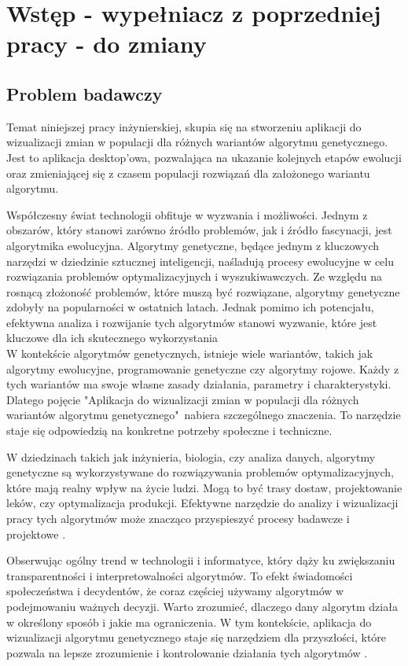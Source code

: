 \chapter[Wstęp]{Wstęp - wypełniacz z poprzedniej pracy - do zmiany}
\section{Problem badawczy}
Temat niniejszej pracy inżynierskiej, skupia się na stworzeniu aplikacji do wizualizacji zmian w populacji dla różnych wariantów algorytmu genetycznego. Jest to aplikacja desktop'owa, pozwalająca na ukazanie kolejnych etapów ewolucji oraz zmieniającej się z czasem populacji rozwiązań dla założonego wariantu algorytmu.

Współczesny świat technologii obfituje w wyzwania i możliwości. Jednym z obszarów, który stanowi zarówno źródło problemów, jak i źródło fascynacji, jest algorytmika ewolucyjna. \linebreak
Algorytmy genetyczne, będące jednym z kluczowych narzędzi w dziedzinie sztucznej inteligencji, naśladują procesy ewolucyjne w celu rozwiązania problemów optymalizacyjnych i wyszukiwawczych. Ze względu na rosnącą złożoność problemów, które muszą być rozwiązane, algorytmy genetyczne zdobyły na popularności w ostatnich latach. Jednak pomimo ich potencjału, efektywna analiza i rozwijanie tych algorytmów stanowi wyzwanie, które jest kluczowe dla ich skutecznego wykorzystania \.\\
W kontekście algorytmów genetycznych, istnieje wiele wariantów, takich jak algorytmy ewolucyjne, programowanie genetyczne czy algorytmy rojowe. Każdy z tych wariantów ma swoje własne zasady działania, parametry i charakterystyki.
Dlatego pojęcie "Aplikacja do wizualizacji zmian w populacji dla różnych wariantów algorytmu genetycznego"\ nabiera szczególnego znaczenia. To narzędzie staje się odpowiedzią na konkretne potrzeby społeczne i techniczne.

W dziedzinach takich jak inżynieria, biologia, czy analiza danych, algorytmy genetyczne są wykorzystywane do rozwiązywania problemów optymalizacyjnych, które mają realny wpływ na życie ludzi. Mogą to być trasy dostaw, projektowanie leków, czy optymalizacja produkcji. Efektywne narzędzie do analizy i wizualizacji pracy tych algorytmów może znacząco przyspieszyć procesy badawcze i projektowe .

Obserwując ogólny trend w technologii i informatyce, który dąży ku zwiększaniu transparentności i interpretowalności algorytmów. To efekt świadomości społeczeństwa i decydentów, że coraz częściej używamy algorytmów w podejmowaniu ważnych decyzji. Warto zrozumieć, dlaczego dany algorytm działa w określony sposób i jakie ma ograniczenia. W tym kontekście, aplikacja do wizualizacji algorytmu genetycznego staje się narzędziem dla przyszłości, które pozwala na lepsze zrozumienie i kontrolowanie działania tych algorytmów .

